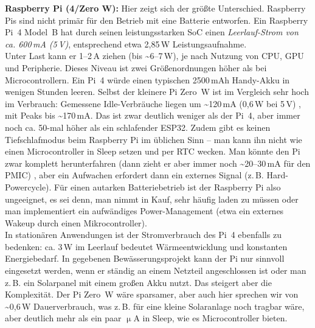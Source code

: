 \noindent\textbf{Raspberry Pi (4/Zero W):} Hier zeigt sich der größte Unterschied. Raspberry Pis sind nicht primär für den Betrieb mit eine Batterie entworfen. Ein Raspberry Pi~4 Model~B hat durch seinen leistungsstarken SoC einen \textit{Leerlauf-Strom von ca. 600\,mA (5\,V)}, entsprechend etwa 2{,}85\,W Leistungsaufnahme. \autocite{raspberry_pi_datasheet} 
\\
Unter Last kann er 1–2\,A ziehen (bis \textasciitilde6–7\,W), je nach Nutzung von CPU, GPU und Peripherie. Dieses Niveau ist zwei Größenordnungen höher als bei Microcontrollern. Ein Pi~4 würde einen typischen 2500\,mAh Handy-Akku in wenigen Stunden leeren. Selbst der kleinere Pi Zero~W ist im Vergleich sehr hoch im Verbrauch: Gemessene Idle-Verbräuche liegen um \textasciitilde120\,mA (0{,}6\,W bei 5\,V) , mit Peaks bis \textasciitilde170\,mA.\autocite{raspberry_pi_w_datasheet} Das ist zwar deutlich weniger als der Pi~4, aber immer noch ca. 50-mal höher als ein schlafender ESP32. Zudem gibt es keinen Tiefschlafmodus beim Raspberry Pi im üblichen Sinn – man kann ihn nicht wie einen Microcontroller in Sleep setzen und per RTC wecken. Man könnte den Pi zwar komplett herunterfahren (dann zieht er aber immer noch \textasciitilde20–30\,mA für den PMIC) \autocite{raspberry_pi_datasheet}, aber ein Aufwachen erfordert dann ein externes Signal (z.\,B. Hard-Powercycle). Für einen autarken Batteriebetrieb ist der Raspberry Pi also ungeeignet, es sei denn, man nimmt in Kauf, sehr häufig laden zu müssen oder man implementiert ein aufwändiges Power-Management (etwa ein externes Wakeup durch einen Mikrocontroller). 
\\
In stationären Anwendungen ist der Stromverbrauch des Pi~4 ebenfalls zu bedenken: ca. 3\,W im Leerlauf bedeutet Wärmeentwicklung und konstanten Energiebedarf. In gegebenen Bewässerungsprojekt kann der Pi nur sinnvoll eingesetzt werden, wenn er ständig an einem Netzteil angeschlossen ist oder man z.\,B. ein Solarpanel mit einem großen Akku nutzt. Das steigert aber die Komplexität. Der Pi Zero~W wäre sparsamer, aber auch hier sprechen wir von \textasciitilde0{,}6\,W Dauerverbrauch, was z.\,B. für eine kleine Solaranlage noch tragbar wäre, aber deutlich mehr als ein paar $\upmu$A in Sleep, wie es Microcontroller bieten.


\vspace{5mm}

